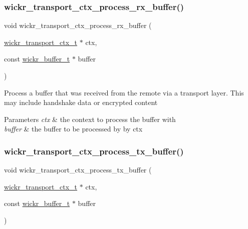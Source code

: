 \subsubsection{\texorpdfstring{wickr\+\_\+transport\+\_\+ctx\+\_\+process\+\_\+rx\+\_\+buffer()}{wickr\_transport\_ctx\_process\_rx\_buffer()}}
{\footnotesize\ttfamily void wickr\+\_\+transport\+\_\+ctx\+\_\+process\+\_\+rx\+\_\+buffer (\begin{DoxyParamCaption}\item[{\hyperlink{structwickr__transport__ctx}{wickr\+\_\+transport\+\_\+ctx\+\_\+t} $\ast$}]{ctx,  }\item[{const \hyperlink{structwickr__buffer}{wickr\+\_\+buffer\+\_\+t} $\ast$}]{buffer }\end{DoxyParamCaption})}

Process a buffer that was received from the remote via a transport layer. This may include handshake data or encrypted content


\begin{DoxyParams}{Parameters}
{\em ctx} & the context to process the buffer with \\
\hline
{\em buffer} & the buffer to be processed by by \textquotesingle{}ctx\textquotesingle{} \\
\hline
\end{DoxyParams}
\mbox{\label{group__wickr__transport__ctx_gad9d2f86832cfb9c1948ba679fabbedbc}} 
\subsubsection{\texorpdfstring{wickr\+\_\+transport\+\_\+ctx\+\_\+process\+\_\+tx\+\_\+buffer()}{wickr\_transport\_ctx\_process\_tx\_buffer()}}
{\footnotesize\ttfamily void wickr\+\_\+transport\+\_\+ctx\+\_\+process\+\_\+tx\+\_\+buffer (\begin{DoxyParamCaption}\item[{\hyperlink{structwickr__transport__ctx}{wickr\+\_\+transport\+\_\+ctx\+\_\+t} $\ast$}]{ctx,  }\item[{const \hyperlink{structwickr__buffer}{wickr\+\_\+buffer\+\_\+t} $\ast$}]{buffer }\end{DoxyParamCaption})}

